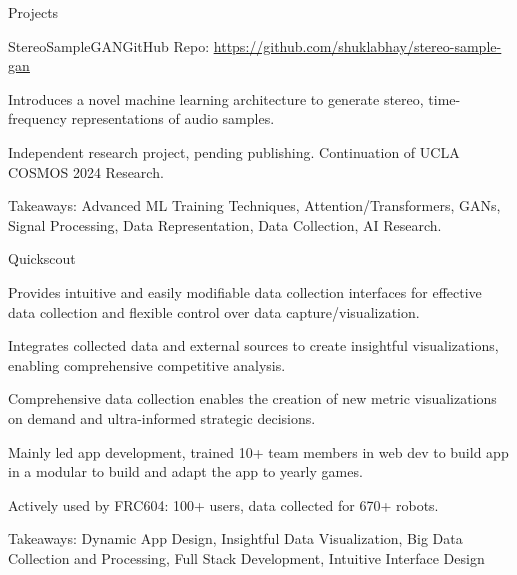 \documentclass[
  11pt, %
]{public/resume/resume} %
\begin{document}
\begin{rSection}{Projects}

  
  \begin{rSubsection}{StereoSampleGAN}{}{GitHub Repo: \underline{\href{https://github.com/shuklabhay/stereo-sample-gan}{https://github.com/shuklabhay/stereo-sample-gan}}}{}
       
    \item Introduces a novel machine learning architecture to generate stereo, time-frequency representations of audio samples.
        
    \item Independent research project, pending publishing. Continuation of UCLA COSMOS 2024 Research.
        
    \item Takeaways: Advanced ML Training Techniques, Attention/Transformers, GANs, Signal Processing, Data Representation, Data Collection, AI Research.
        
  \end{rSubsection}
      
  \begin{rSubsection}{Quickscout}{}{\underline{}{}
       
    \item Provides intuitive and easily modifiable data collection interfaces for effective data collection and flexible control over data capture/visualization.
        
    \item Integrates collected data and external sources to create insightful visualizations, enabling comprehensive competitive analysis.
        
    \item Comprehensive data collection enables the creation of new metric visualizations on demand and ultra-informed strategic decisions.
        
    \item Mainly led app development, trained 10+ team members in web dev to build app in a modular to build and adapt the app to yearly games.
        
    \item Actively used by FRC604: 100+ users, data collected for 670+ robots.
        
    \item Takeaways: Dynamic App Design, Insightful Data Visualization, Big Data Collection and Processing, Full Stack Development, Intuitive Interface Design
        
}
\end{rSubsection}
\end{rSection}
\end{document}
